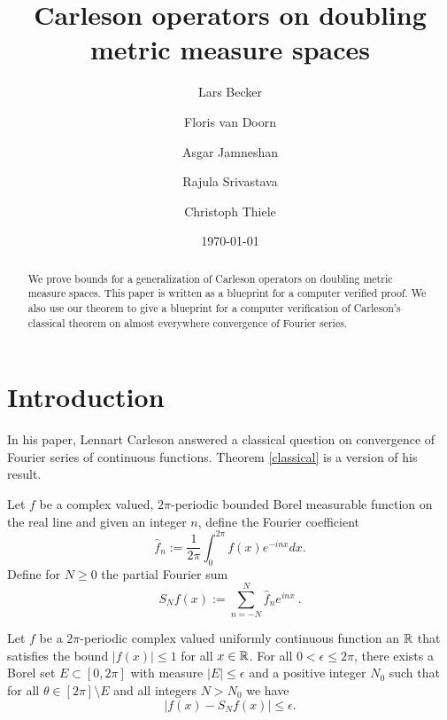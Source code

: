 \title{Carleson operators on doubling metric measure spaces}

\author{Lars Becker \and Floris van Doorn \and Asgar Jamneshan \and Rajula Srivastava \and Christoph Thiele}

\date{\today}

\begin{abstract}
We prove  bounds for a generalization of Carleson operators on doubling metric measure spaces.
This paper is written as a blueprint for a computer verified proof. We also use our theorem to give a blueprint for a computer verification of Carleson's classical theorem on almost everywhere convergence of Fourier series.
\end{abstract}

\maketitle

\tableofcontents

\chapter{Introduction}

In his \cite{carleson} paper, Lennart Carleson
answered a classical question on convergence of
Fourier series of continuous functions. Theorem
\ref{classical} is a version of his result.

Let $f$ be a complex valued, $2\pi $-periodic bounded Borel measurable function on the real line and given an integer $n$, define the Fourier coefficient
\begin{equation}
    \widehat{f}_n:=\frac {1}{2\pi} \int_0^{2\pi} f(x) e^{- i nx} dx .
\end{equation}
Define for $N\ge 0$ the partial Fourier sum
\begin{equation}
    S_Nf(x):=\sum_{n=-N}^N \widehat{f}_n e^{i nx}\ .
\end{equation}
\begin{theorem}\label{classical}
Let $f$ be a $2\pi $-periodic complex valued uniformly continuous function an $\mathbb{R}$ that satisfies the bound
$|f(x)|\le 1$ for all $x\in \mathbb{R}$. For all $0<\epsilon\le 2\pi$,
there exists a Borel set $E\subset [0,2\pi]$ with measure
$|E|\le \epsilon$ and a positive integer $N_0$ such that for all
$\theta\in [2\pi]\setminus E$  and all integers $N>N_0$ we have
\begin{equation}\label{aeconv}
|f(x)-S_N f(x)|\le \epsilon.
\end{equation}
\end{theorem}

